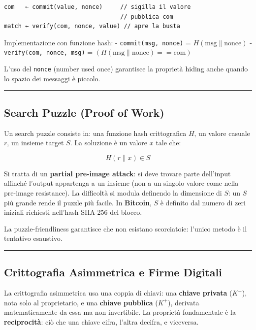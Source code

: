 \documentclass[
  italian,
  openany]{book}
\begin{document}
\begin{verbatim}
com   ← commit(value, nonce)     // sigilla il valore
                                 // pubblica com
match ← verify(com, nonce, value) // apre la busta
\end{verbatim}

Implementazione con funzione hash: - \texttt{commit(msg,\ nonce)} =
\(H(\text{msg} \| \text{nonce})\) - \texttt{verify(com,\ nonce,\ msg)} =
\((H(\text{msg} \| \text{nonce}) == \text{com})\)

L'uso del \texttt{nonce} (number used once) garantisce la proprietà
hiding anche quando lo spazio dei messaggi è piccolo.

\begin{center}\rule{0.5\linewidth}{0.5pt}\end{center}

\subsection{Search Puzzle (Proof of
Work)}\label{search-puzzle-proof-of-work}

Un search puzzle consiste in: una funzione hash crittografica \(H\), un
valore casuale \(r\), un insieme target \(S\). La soluzione è un valore
\(x\) tale che:

\[H(r \| x) \in S\]

Si tratta di un \textbf{partial pre-image attack}: si deve trovare parte
dell'input affinché l'output appartenga a un insieme (non a un singolo
valore come nella pre-image resistance). La difficoltà si modula
definendo la dimensione di \(S\): un \(S\) più grande rende il puzzle
più facile. In \textbf{Bitcoin}, \(S\) è definito dal numero di zeri
iniziali richiesti nell'hash SHA-256 del blocco.

La puzzle-friendliness garantisce che non esistano scorciatoie: l'unico
metodo è il tentativo esaustivo.

\begin{center}\rule{0.5\linewidth}{0.5pt}\end{center}

\subsection{Crittografia Asimmetrica e Firme
Digitali}\label{crittografia-asimmetrica-e-firme-digitali}

La crittografia asimmetrica usa una coppia di chiavi: una \textbf{chiave
privata} (\(K^-\)), nota solo al proprietario, e una \textbf{chiave
pubblica} (\(K^+\)), derivata matematicamente da essa ma non
invertibile. La proprietà fondamentale è la \textbf{reciprocità}: ciò
che una chiave cifra, l'altra decifra, e viceversa.
\end{document}
